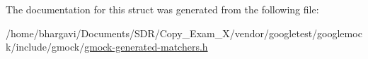 The documentation for this struct was generated from the following file\+:\begin{DoxyCompactItemize}
\item 
/home/bhargavi/\+Documents/\+S\+D\+R/\+Copy\+\_\+\+Exam\+\_\+X/vendor/googletest/googlemock/include/gmock/\hyperlink{gmock-generated-matchers_8h}{gmock-\/generated-\/matchers.\+h}\end{DoxyCompactItemize}
